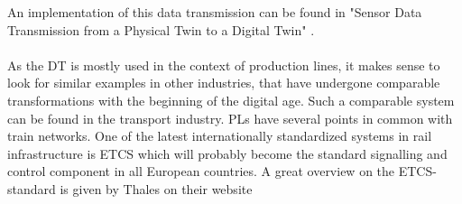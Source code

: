 An implementation of this data transmission can be found in "Sensor Data Transmission from a Physical Twin to a Digital Twin" \cite{AlaDTdataTransmission}.\\
\\
As the \ac{DT} is mostly used in the context of production lines, it makes sense to look for similar examples in other industries, that have undergone comparable transformations with the beginning of the digital age.
Such a comparable system can be found in the transport industry. 
\acp{PL} have several points in common with train networks.
One of the latest internationally standardized systems in rail infrastructure is \ac{ETCS} which will probably become the standard signalling and control component in all European countries. 
A great overview on the \ac{ETCS}-standard is given by Thales on their website \cite{ThalesETCS}
























